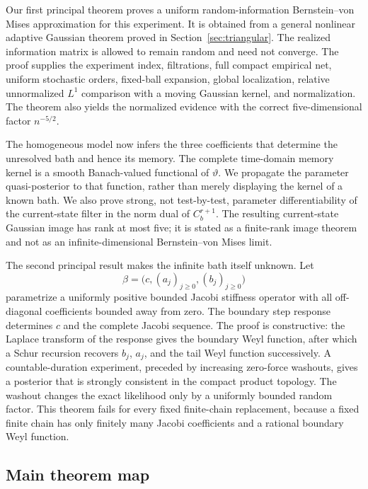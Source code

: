 Our first principal theorem proves a uniform random-information Bernstein--von Mises approximation for this experiment.  It is obtained from a general nonlinear adaptive Gaussian theorem proved in Section~\ref{sec:triangular}.  The realized information matrix is allowed to remain random and need not converge.  The proof supplies the experiment index, filtrations, full compact empirical net, uniform stochastic orders, fixed-ball expansion, global localization, relative unnormalized \(L^1\) comparison with a moving Gaussian kernel, and normalization.  The theorem also yields the normalized evidence with the correct five-dimensional factor \(n^{-5/2}\).

The homogeneous model now infers the three coefficients that determine the unresolved bath and hence its memory.  The complete time-domain memory kernel is a smooth Banach-valued functional of \(\vartheta\).  We propagate the parameter quasi-posterior to that function, rather than merely displaying the kernel of a known bath.  We also prove strong, not test-by-test, parameter differentiability of the current-state filter in the norm dual of \(C_b^{r+1}\).  The resulting current-state Gaussian image has rank at most five; it is stated as a finite-rank image theorem and not as an infinite-dimensional Bernstein--von Mises limit.

The second principal result makes the infinite bath itself unknown.  Let
\[
 \beta=\bigl(c,(a_j)_{j\ge0},(b_j)_{j\ge0}\bigr)
\]
parametrize a uniformly positive bounded Jacobi stiffness operator with all off-diagonal coefficients bounded away from zero.  The boundary step response determines \(c\) and the complete Jacobi sequence.  The proof is constructive: the Laplace transform of the response gives the boundary Weyl function, after which a Schur recursion recovers \(b_j\), \(a_j\), and the tail Weyl function successively.  A countable-duration experiment, preceded by increasing zero-force washouts, gives a posterior that is strongly consistent in the compact product topology.  The washout changes the exact likelihood only by a uniformly bounded random factor.  This theorem fails for every fixed finite-chain replacement, because a fixed finite chain has only finitely many Jacobi coefficients and a rational boundary Weyl function.

\subsection{Main theorem map}


